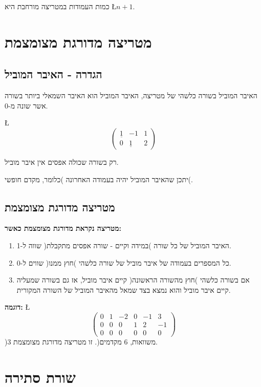 \documentclass[english,hebrew]{article}
\begin{document}
כמות העמודות במטריצה מורחבת היא \L{$n+1$}.

\section{מטריצה מדורגת מצומצמת}

\subsection{הגדרה - האיבר המוביל}

האיבר המוביל בשורה כלשהי של מטריצה, האיבר המוביל הוא האיבר השמאלי
ביותר בשורה אשר שונה מ-0.

\L{%
\[
\left(\begin{array}{cc|c}
\underline{1} & -1 & 1\\
0 & \underline{1} & 2
\end{array}\right)
\]
}%

רק בשורה שכולה אפסים אין איבר מוביל.

יתכן שהאיבר המוביל יהיה בעמודה האחרונה )כלומר, מקדם חופשי(.

\subsection{מטריצה מדורגת מצומצמת}

\textbf{מטריצה נקראת מדורגת מצומצמת כאשר:} 
\begin{enumerate}
\item האיבר המוביל של כל שורה )במידה וקיים - שורה אפסים מתקבלת( שווה ל-1. 
\item כל המספרים בעמודה של איבר מוביל של שורה כלשהי )חוץ ממנו( שווים ל-0. 
\item אם בשורה כלשהי )חוץ מהשורה הראשונה( קיים איבר מוביל, אז גם בשורה שמעליה
קיים איבר מוביל והוא נמצא בצד שמאל מהאיבר המוביל של השורה המקורית. 
\end{enumerate}
\textbf{דוגמה:} \L{%
\[
\left(\begin{array}{ccccc|c}
0 & 1 & -2 & 0 & -1 & 3\\
0 & 0 & 0 & 1 & 2 & -1\\
0 & 0 & 0 & 0 & 0 & 0
\end{array}\right)
\]
}%
)3 משוואות, 6 מקדמים(. זו מטריצה מדורגת מצומצמת.

\bigskip{}

\section{שורת סתירה}
\end{document}
